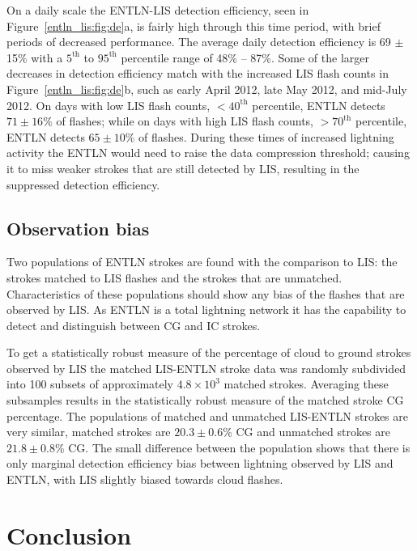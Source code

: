 On a daily scale the ENTLN-LIS detection efficiency, seen in Figure~\ref{entln_lis:fig:de}a, is fairly high through this time period, with brief periods of decreased performance.
The average daily detection efficiency is 69 $\pm$ 15\% with a $5^\text{th}$ to $95^\text{th}$ percentile range of 48\% -- 87\%.
Some of the larger decreases in detection efficiency match with the increased LIS flash counts in Figure~\ref{entln_lis:fig:de}b, such as early April 2012, late May 2012, and mid-July 2012.
On days with low LIS flash counts, $<40^\text{th}$ percentile, ENTLN detects $71\pm16$\% of flashes; while on days with high LIS flash counts, $>70^\text{th}$ percentile, ENTLN detects $65\pm10$\% of flashes.
During these times of increased lightning activity the ENTLN would need to raise the data compression threshold; causing it to miss weaker strokes that are still detected by LIS, resulting in the suppressed detection efficiency.

\subsection{Observation bias}

Two populations of ENTLN strokes are found with the comparison to LIS: the strokes matched to LIS flashes and the strokes that are unmatched.
Characteristics of these populations should show any bias of the flashes that are observed by LIS.
As ENTLN is a total lightning network it has the capability to detect and distinguish between CG and IC strokes.

To get a statistically robust measure of the percentage of cloud to ground strokes observed by LIS the matched LIS-ENTLN stroke data was randomly subdivided into 100 subsets of approximately $4.8\times10^3$ matched strokes.
Averaging these subsamples results in the statistically robust measure of the matched stroke CG percentage.
The populations of matched and unmatched LIS-ENTLN strokes are very similar, matched strokes are $20.3\pm0.6$\% CG and unmatched strokes are $21.8\pm0.8$\% CG.
The small difference between the population shows that there is only marginal detection efficiency bias between lightning observed by LIS and ENTLN, with LIS slightly biased towards cloud flashes.

\section{Conclusion}

